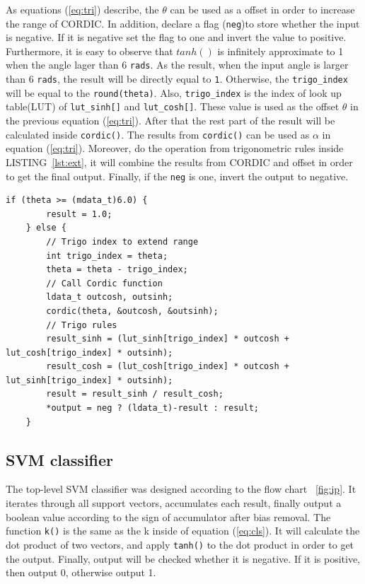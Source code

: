 \documentclass[journal]{IEEEtran}
\newcommand{\fref}[1]{\figurename~\ref{#1}}
\newcommand{\eref}[1]{(\ref{#1})}
\newcommand{\lref}[1]{LISTING~\ref{#1}}
\begin{document}
As equations \eref{eq:tri} describe, the $\theta$ can be used as a offset in order to increase the range of CORDIC.  In addition, declare a flag (\texttt{neg})to store whether the input is negative. If it is negative set the flag to one and invert the value to positive. Furthermore, it is easy to observe that $tanh()$ is infinitely approximate to 1 when the angle lager than 6 \texttt{rads}. As the result, when the input angle is larger than 6 \texttt{rads}, the result will be directly equal to \texttt{1}. Otherwise, the \texttt{trigo\_index} will be equal to the \texttt{round(theta)}. Also, \texttt{trigo\_index} is the index of look up table(LUT) of \texttt{lut\_sinh[]} and \texttt{lut\_cosh[]}. These value is used as the offset $\theta$ in the previous equation \eref{eq:tri}. After that the rest part of the result will be calculated inside \texttt{cordic()}. The results from \texttt{cordic()} can be used as $\alpha$ in equation \eref{eq:tri}. Moreover, do the operation from trigonometric rules inside \lref{lst:ext}, it will combine the results from CORDIC and offset in order to get the final output. Finally, if the \texttt{neg} is one, invert the output to negative. \cite{llamocca2007fixed}

\begin{lstlisting}[caption={Extending the range of CORDIC},captionpos=b,label=lst:ext]
	if (theta >= (mdata_t)6.0) {
		result = 1.0;
	} else {
		// Trigo index to extend range
		int trigo_index = theta;
		theta = theta - trigo_index;
		// Call Cordic function
		ldata_t outcosh, outsinh;
		cordic(theta, &outcosh, &outsinh);
		// Trigo rules
		result_sinh = (lut_sinh[trigo_index] * outcosh + lut_cosh[trigo_index] * outsinh);
		result_cosh = (lut_cosh[trigo_index] * outcosh + lut_sinh[trigo_index] * outsinh);
		result = result_sinh / result_cosh;
		*output = neg ? (ldata_t)-result : result;
	}
\end{lstlisting}

\subsection{SVM classifier}

The top-level SVM classifier was designed according to the flow chart \fref{fig:ip}. It iterates through all support vectors, accumulates each result, finally output a boolean value according to the sign of accumulator after bias removal. The function \texttt{k()} is the same as the k inside of equation \eref{eq:cls}. It will calculate the dot product of two vectors, and apply \texttt{tanh()} to the dot product in order to get the output. Finally, output will be checked whether it is negative. If it is positive, then output 0, otherwise output 1.
\end{document}
